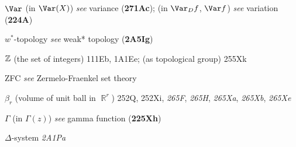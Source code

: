 \indexmedskip
{}

$\Var$ (in $\Var(X)$) {\it see} variance ({\bf 271Ac});
  (in $\Var_Df$, $\Var f$) {\it see} variation ({\bf 224A})




\indexmedskip
{}



$w^*$-topology {\it see} weak* topology ({\bf 2A5Ig})











\indexmedskip
{}

$\Bbb Z$ (the set of integers) 111Eb, 1A1Ee;
  (as topological group) 255Xk
  







ZFC {\it see} Zermelo-Fraenkel set theory

 



\indexmedskip\indexheader{$\scriptstyle\pmb{\beta}$} 

$\beta_r$ (volume of unit ball in $\BbbR^r$) 252Q, 252Xi,
{\it 265F}, {\it 265H}, {\it 265Xa}, {\it 265Xb}, {\it 265Xe}





\indexmedskip\indexheader{$\scriptstyle\pmb{\Gamma}$} 

$\Gamma$ (in $\Gamma(z)$) {\it see} gamma function ({\bf 225Xh})



\indexmedskip\indexheader{$\scriptstyle\pmb{\Delta}$}





$\Delta$-system {\it 2A1Pa}



















\indexmedskip\indexheader{$\scriptstyle\pmb{\lambda}$}



\indexmedskip\indexheader{$\scriptstyle\pmb{\mu}$}

